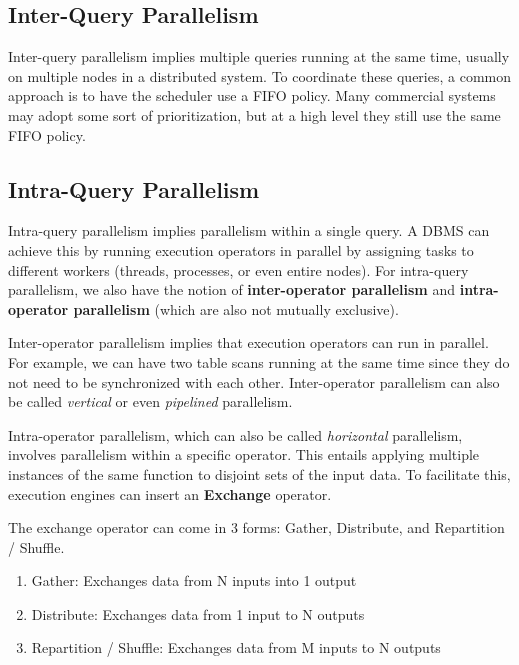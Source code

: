 \documentclass[11pt]{article}
\begin{document}
\subsection{Inter-Query Parallelism}

Inter-query parallelism implies multiple queries running at the same time,
usually on multiple nodes in a distributed system. To coordinate these queries,
a common approach is to have the scheduler use a FIFO policy.
Many commercial systems may adopt some sort of prioritization,
but at a high level they still use the same FIFO policy.
\\

\subsection{Intra-Query Parallelism}
Intra-query parallelism implies parallelism within a single query.
A DBMS can achieve this by running execution operators in parallel by
assigning tasks to different workers (threads, processes, or even entire nodes).
For intra-query parallelism, we also have the notion of
\textbf{inter-operator parallelism} and \textbf{intra-operator parallelism}
(which are also not mutually exclusive).

Inter-operator parallelism implies that execution operators can run in parallel.
For example, we can have two table scans running at the same time since they do
not need to be synchronized with each other. Inter-operator parallelism can also
be called \textit{vertical} or even \textit{pipelined} parallelism.

Intra-operator parallelism, which can also be called \textit{horizontal}
parallelism, involves parallelism within a specific operator.
This entails applying multiple instances of the same function to disjoint
sets of the input data. To facilitate this, execution engines can insert an
\textbf{Exchange} operator.

The exchange operator can come in 3 forms: Gather, Distribute,
and Repartition / Shuffle.
\begin{enumerate}
    \item Gather: Exchanges data from N inputs into 1 output
    \item Distribute: Exchanges data from 1 input to N outputs
    \item Repartition / Shuffle: Exchanges data from M inputs to N outputs
\end{enumerate}


\end{document}

